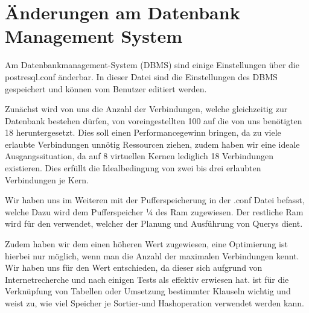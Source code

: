 \section{Änderungen am Datenbank Management System}

Am Datenbankmanagement-System (DBMS) sind einige Einstellungen über die postresql.conf änderbar. In 
dieser Datei sind die Einstellungen des DBMS gespeichert und können vom Benutzer editiert werden.
 
Zunächst wird von uns die Anzahl der Verbindungen, welche gleichzeitig zur Datenbank bestehen 
dürfen, von voreingestellten 100 auf die von uns benötigten
18 heruntergesetzt.
Dies soll einen Performancegewinn bringen, da zu viele erlaubte Verbindungen unnötig Ressourcen 
ziehen, zudem haben wir eine ideale Ausgangssituation, da auf 8 virtuellen Kernen lediglich 18 
Verbindungen existieren. Dies erfüllt die Idealbedingung von zwei bis drei erlaubten Verbindungen 
je Kern.

Wir haben uns im Weiteren mit der Pufferspeicherung in der .conf Datei befasst, welche 
 Dazu wird dem Pufferspeicher ¼ des Ram zugewiesen. Der restliche Ram wird für 
den  verwendet, welcher der Planung und Ausführung von
Querys dient.
  
Zudem haben wir dem einen höheren Wert zugewiesen, eine Optimierung ist hierbei nur 
möglich, wenn man die Anzahl der maximalen Verbindungen kennt. Wir haben uns für den Wert 
 entschieden, da dieser sich aufgrund von
Internetrecherche und nach einigen Tests als effektiv erwiesen hat.  ist für die 
Verknüpfung von Tabellen oder Umsetzung bestimmter Klauseln wichtig und weist zu, wie viel Speicher 
je Sortier-und Hashoperation verwendet werden kann.


\clearpage